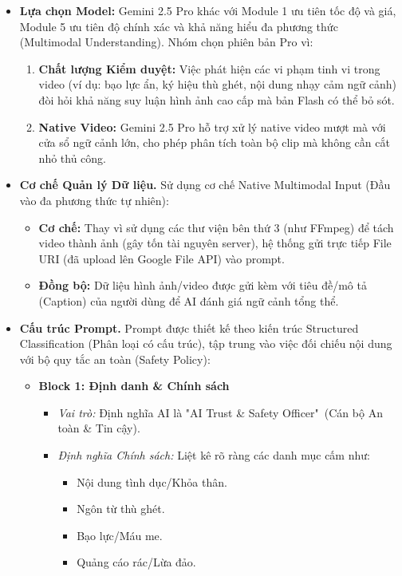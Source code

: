 \begin{itemize}
    \item \textbf{Lựa chọn Model:} Gemini 2.5 Pro khác với Module 1 ưu tiên tốc độ và giá, Module 5 ưu tiên độ chính xác và khả năng hiểu đa phương thức (Multimodal Understanding). Nhóm chọn phiên bản Pro vì:
    \begin{enumerate}[label=\arabic*., leftmargin=*]
        \item \textbf{Chất lượng Kiểm duyệt:} Việc phát hiện các vi phạm tinh vi trong video (ví dụ: bạo lực ẩn, ký hiệu thù ghét, nội dung nhạy cảm ngữ cảnh) đòi hỏi khả năng suy luận hình ảnh cao cấp mà bản Flash có thể bỏ sót.
        
        \item \textbf{Native Video:} Gemini 2.5 Pro hỗ trợ xử lý native video mượt mà với cửa sổ ngữ cảnh lớn, cho phép phân tích toàn bộ clip mà không cần cắt nhỏ thủ công.
    \end{enumerate}

    \item \textbf{Cơ chế Quản lý Dữ liệu.} Sử dụng cơ chế Native Multimodal Input (Đầu vào đa phương thức tự nhiên):
    \begin{itemize}
        \item \textbf{Cơ chế:} Thay vì sử dụng các thư viện bên thứ 3 (như FFmpeg) để tách video thành ảnh (gây tốn tài nguyên server), hệ thống gửi trực tiếp File URI (đã upload lên Google File API) vào prompt.
        \item \textbf{Đồng bộ:} Dữ liệu hình ảnh/video được gửi kèm với tiêu đề/mô tả (Caption) của người dùng để AI đánh giá ngữ cảnh tổng thể.
    \end{itemize}

    \item \textbf{Cấu trúc Prompt.} Prompt được thiết kế theo kiến trúc Structured Classification (Phân loại có cấu trúc), tập trung vào việc đối chiếu nội dung với bộ quy tắc an toàn (Safety Policy):
    \begin{itemize}
        \item \textbf{Block 1: Định danh \& Chính sách}
        \begin{itemize}
            \item \textit{Vai trò:} Định nghĩa AI là "AI Trust \& Safety Officer"\ (Cán bộ An toàn \& Tin cậy).
            \item \textit{Định nghĩa Chính sách:} Liệt kê rõ ràng các danh mục cấm như:
            \begin{itemize}
                \item Nội dung tình dục/Khỏa thân.
                \item Ngôn từ thù ghét.
                \item Bạo lực/Máu me.
                \item Quảng cáo rác/Lừa đảo.
            \end{itemize}
        \end{itemize}
        

\end{itemize}
\end{itemize}

